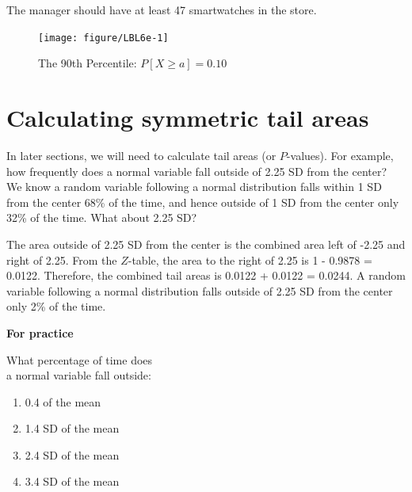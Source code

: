 \documentclass[11pt, chapterprefix=true]{scrbook}\usepackage[]{graphicx}\usepackage[]{color}
\begin{document}
\newpage

The manager should have at least 47 smartwatches in the store.

\begin{figure}[ht]

\caption{The 90th Percentile: $P[X \ge a] = 0.10$ }




{\centering \texttt{[image: figure/LBL6e-1]} 

}




\end{figure}


\section{Calculating symmetric tail areas}

In later sections, we will need to calculate tail areas (or $P$-values).  For example, how frequently does a normal variable fall outside of 2.25 SD from the center?  We know a random variable following a normal distribution falls within 1 SD from the center 68\% of the time, and hence outside of 1 SD from the center only 32\% of the time.  What about 2.25 SD?

The area outside of 2.25 SD from the center is the combined area left of -2.25 and right of 2.25.  From the $Z$-table, the area to the right of 2.25 is 1 - 0.9878 = 0.0122.  Therefore, the combined tail areas is 0.0122 + 0.0122 = 0.0244.  A random variable following a normal distribution falls outside of 2.25 SD from the center only 2\% of the time.

\begin{minipage}[ht]{3cm}

\textbf{For practice}
\end{minipage}
\begin{minipage}[ht]{6cm}

\parbox{6cm}{
  What percentage of time does \\ a normal variable fall outside:

  \begin{enumerate}
  \item 0.4 of the mean
  \item 1.4 SD of the mean
  \item 2.4 SD of the mean
  \item 3.4 SD of the mean
  \end{enumerate}
}
\end{minipage}
\end{document}
